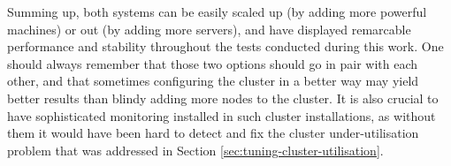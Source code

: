 Summing up, both systems can be easily scaled up (by adding more powerful machines) or out (by adding more servers), and have displayed remarcable performance and stability throughout the tests conducted during this work. One should always remember that those two options should go in pair with each other, and that sometimes configuring the cluster in a better way may yield better results than blindy adding more nodes to the cluster. It is also crucial to have sophisticated monitoring installed in such cluster installations, as without them it would have been hard to detect and fix the cluster under-utilisation problem that was addressed in Section \ref{sec:tuning-cluster-utilisation}.


